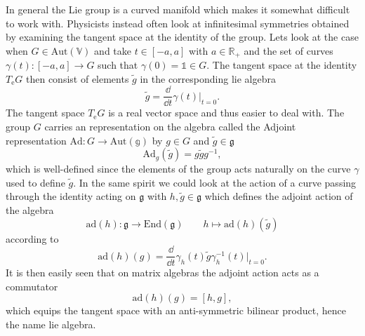In general the Lie group is a curved manifold which makes it somewhat difficult to work with. Physicists instead often look at infinitesimal symmetries obtained by examining the tangent space at the identity of the group. Lets look at the case when $G\in \text{Aut}(\mathbb{V})$ and take $t\in [-a,a]$ with $a\in\mathbb{R_+}$ and the set of curves $\gamma(t): [-a,a]\to G$ such that $\gamma(0)= \mathbb{1}\in G$. The tangent space at the identity $T_\mathrm{e}G$ then consist of elements $\tilde{g}$ in the corresponding lie algebra
\begin{equation}
\tilde{g} = \frac{\dd}{\dd t}\gamma(t)|_{t=0}.
\end{equation}
The tangent space $T_\mathrm{e}G$ is a real vector space and thus easier to deal with. The group $G$ carries an representation on the algebra called the Adjoint representation $\text{Ad}: G\to \text{Aut}(\mathbb{g})$ by $g\in G$ and $\tilde{g}\in\mathfrak{g}$
\begin{equation}
    \text{Ad}_g(\tilde{g}) = g\tilde{g}g^{-1},
\end{equation}
which is well-defined since the elements of the group acts naturally on the curve $\gamma$ used to define $\tilde{g}$. In the same spirit we could look at the action of a curve passing through the identity acting on $\mathfrak{g}$ with $h,\tilde{g}\in \mathfrak{g}$ which defines the adjoint action of the algebra 
\begin{equation}
    \text{ad}(h): \mathfrak{g}\to \text{End}(\mathfrak{g})\qquad h\mapsto \text{ad}(h)(\tilde{g})
\end{equation}
according to 
\begin{equation}
    \text{ad}(h)(g) = \frac{\dd}{\dd t}\gamma_h(t)\tilde{g}\gamma_h^{-1}(t)|_{t=0}.
\end{equation}
It is then easily seen that on matrix algebras the adjoint action acts as a commutator 
\begin{equation}
    \text{ad}(h)(g) = [h,g],
\end{equation}
which equips the tangent space with an anti-symmetric bilinear product, hence the name lie algebra. 

